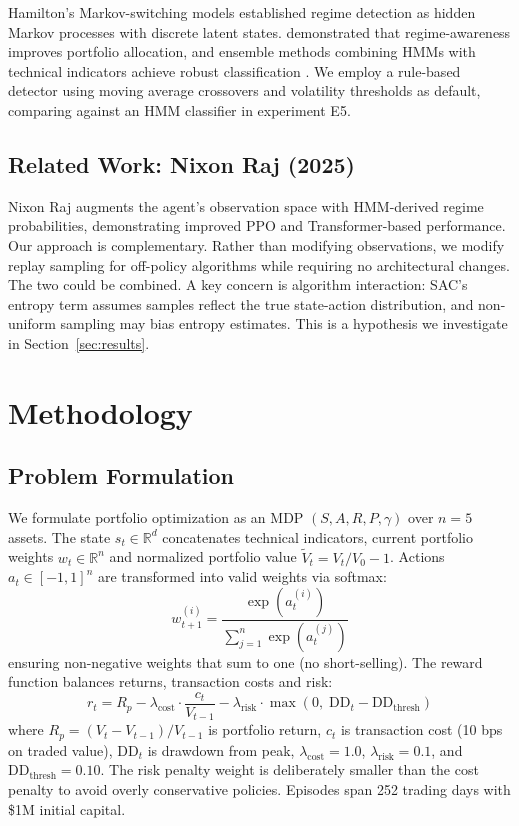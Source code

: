 \documentclass[11pt,a4paper]{article}
\begin{document}
Hamilton's Markov-switching models \citep{hamilton1989regime} established regime detection as hidden Markov processes with discrete latent states. \citet{ang2002regime} demonstrated that regime-awareness improves portfolio allocation, and ensemble methods combining HMMs with technical indicators achieve robust classification \citep{gupta2025forest}. We employ a rule-based detector using moving average crossovers and volatility thresholds as default, comparing against an HMM classifier in experiment E5.

\subsection{Related Work: Nixon Raj (2025)}

Nixon Raj \citep{nixon2025regime} augments the agent's observation space with HMM-derived regime probabilities, demonstrating improved PPO and Transformer-based performance. Our approach is complementary. Rather than modifying observations, we modify replay sampling for off-policy algorithms while requiring no architectural changes. The two could be combined. A key concern is algorithm interaction: SAC's entropy term assumes samples reflect the true state-action distribution, and non-uniform sampling may bias entropy estimates. This is a hypothesis we investigate in Section~\ref{sec:results}.



\section{Methodology}
\label{sec:methodology}

\subsection{Problem Formulation}

We formulate portfolio optimization as an MDP $(S, A, R, P, \gamma)$ over $n=5$ assets. The state $s_t \in \mathbb{R}^d$ concatenates technical indicators, current portfolio weights $w_t \in \mathbb{R}^n$ and normalized portfolio value $\tilde{V}_t = V_t / V_0 - 1$. Actions $a_t \in [-1, 1]^n$ are transformed into valid weights via softmax:
\begin{equation}
    w_{t+1}^{(i)} = \frac{\exp(a_t^{(i)})}{\sum_{j=1}^{n} \exp(a_t^{(j)})}
\end{equation}
ensuring non-negative weights that sum to one (no short-selling). The reward function balances returns, transaction costs and risk:
\begin{equation}
    r_t = R_p - \lambda_{\text{cost}} \cdot \frac{c_t}{V_{t-1}} - \lambda_{\text{risk}} \cdot \max(0,\; \text{DD}_t - \text{DD}_{\text{thresh}})
\end{equation}
where $R_p = (V_t - V_{t-1})/V_{t-1}$ is portfolio return, $c_t$ is transaction cost (10 bps on traded value), $\text{DD}_t$ is drawdown from peak, $\lambda_{\text{cost}} = 1.0$, $\lambda_{\text{risk}} = 0.1$, and $\text{DD}_{\text{thresh}} = 0.10$. The risk penalty weight is deliberately smaller than the cost penalty to avoid overly conservative policies. Episodes span 252 trading days with \$1M initial capital.
\end{document}
